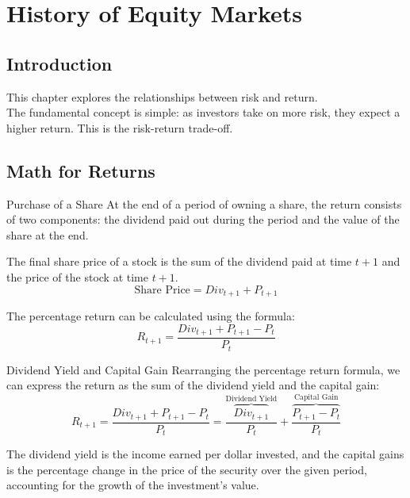 \chapter{History of Equity Markets}

\section{Introduction}
This chapter explores the relationships between risk and return.\\

The fundamental concept is simple: as investors take on more risk, they expect a higher return. This is the risk-return trade-off.\\


\section{Math for Returns}

\begin{definitionbox}{Purchase of a Share}
    At the end of a period of owning a share, the return consists of two components: the dividend paid out during the period and the value of the share at the end.
    
    The final share price of a stock is the sum of the dividend paid at time $t+1$ and the price of the stock at time $t+1$.
    \begin{equation}
        \text{Share Price} = Div_{t+1} + P_{t+1}
    \end{equation}

    The percentage return can be calculated using the formula:
    \begin{equation}
        R_{t+1} = \frac{Div_{t+1} + P_{t+1} - P_t}{P_t}
    \end{equation}
\end{definitionbox}

\begin{definitionbox}{Dividend Yield and Capital Gain}
    Rearranging the percentage return formula, we can express the return as the sum of the dividend yield and the capital gain:
    \begin{equation}
        R_{t+1} = \frac{Div_{t+1} + P_{t+1} - P_t}{P_t}  = \frac{\overbrace{Div_{t+1}}^{\text{Dividend Yield}}}{P_t} + \frac{\overbrace{P_{t+1} - P_t}^{\text{Capital Gain}}}{P_t}
    \end{equation}

    The dividend yield is the income earned per dollar invested, and the capital gains is the percentage change in the price of the security over the given period, accounting for the growth of the investment's value.
\end{definitionbox}

